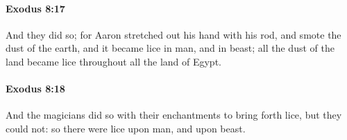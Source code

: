 		\paragraph{Exodus 8:17} %
			\label{EXODUS-8-17}

			And they did so; for Aaron stretched out his hand with his rod, and smote the dust of the earth, and it became lice in man, and in beast; all the dust of the land became lice throughout all the land of Egypt.


		\paragraph{Exodus 8:18} %
			\label{EXODUS-8-18}

			And the magicians did so with their enchantments to bring forth lice, but they could not: so there were lice upon man, and upon beast.


